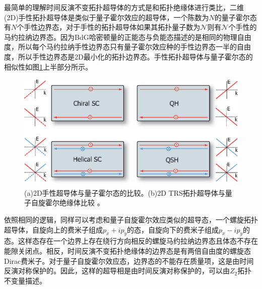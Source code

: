 最简单的理解时间反演不变拓扑超导体的方式是和拓扑绝缘体进行类比，二维(2D)手性拓扑超导体是类似于量子霍尔效应的超导体，一个陈数为$N$的量子霍尔态有$N$个手性边界态，对于手性的拓扑超导体如果其拓扑量子数为$\mathcal{N}$则有$\mathcal{N}$个手性的马约拉纳边界态。因为BdG哈密顿量的正能态与负能态描述的是相同的物理自由度，所以每个马约拉纳手性边界态只有量子霍尔效应种的手性边界态一半的自由度，所以手性边界态是2D最小化的拓扑边界态。手性拓扑超导体与量子霍尔态的相似性如图\ref{fig4}上半部分所示。
\begin{figure}[h]
	\centering
	\includegraphics[scale=0.5]{pic/fig4.eps}
	\caption{(a)2D手性超导体与量子霍尔态的比较。(b)2D TRS拓扑超导体与量子自旋霍尔绝缘体比较\cite{re6} 。}\label{fig4}
\end{figure}
依照相同的逻辑，同样可以考虑和量子自旋霍尔效应类似的超导态，一个螺旋拓扑超导体，自旋向上的费米子组成$p_x+ip_y$的态，自旋向下的费米子组成$p_x-ip_y$的态。这样态存在一个边界上存在绕行方向相反的螺旋马约拉纳边界态且体态不存在能隙关闭点。相反，时间反演不变拓扑绝缘体的边界态是有两倍自由度的螺旋态Dirac费米子。对于量子自旋霍尔效应态，边界态的不能存在质量项，这是由时间反演对称保护的。因此，这样的超导相是由时间反演对称保护的，可以由$\mathit{Z}_2$拓扑不变量描述\cite{re12}。

